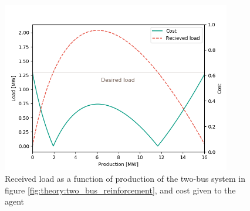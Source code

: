 \documentclass[class=book, crop=false, 11pt]{standalone}
\begin{document}
\begin{figure}[ht!]
    \center
    \includegraphics[height=7.5cm, width=10cm]{figures/twobus_load_balance.png}
    \caption[size = 9]{Received load as a function of production of the two-bus system in figure \ref{fig:theory:two_bus_reinforcement}, and cost given to the agent}
    \label{fig:theory:two_bus_failing}
\end{figure}
\end{document}
